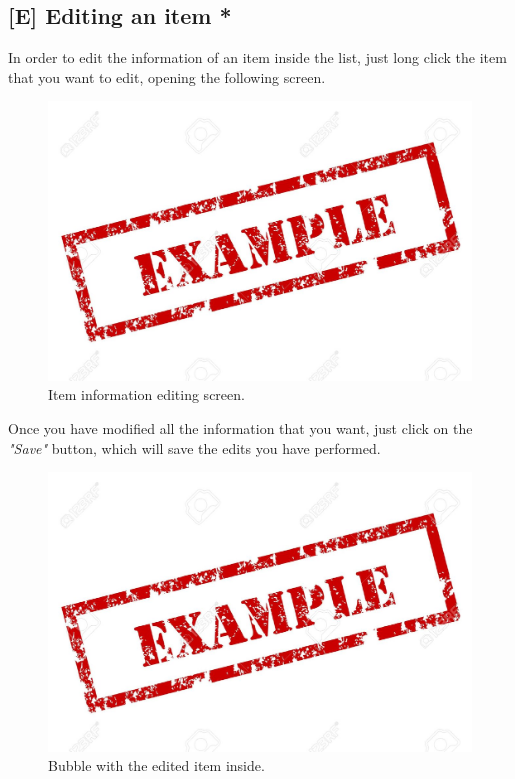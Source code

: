 \subsection{[E] Editing an item *}
In order to edit the information of an item inside the list, just long click the item that you want to edit, opening the following screen.

\begin{figure}[H]
  \centering 
  \includegraphics[width=\textwidth]{Sections/3-HowToUse/Images/example.jpeg}
  \caption{Item information editing screen.}
\end{figure}

Once you have modified all the information that you want, just click on the \textit{"Save"} button, which will save the edits you have performed.

\begin{figure}[H]
  \centering 
  \includegraphics[width=\textwidth]{Sections/3-HowToUse/Images/example.jpeg}
  \caption{Bubble with the edited item inside.}
\end{figure}